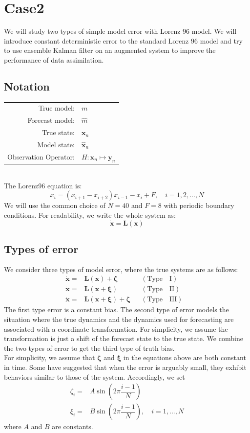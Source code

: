 \documentclass[twocolumn]{article}
\begin{document}
\section{Case2}
We will study two types of simple model error with Lorenz 96 model. We will introduce constant deterministic error to the standard Lorenz 96 model and try to use ensemble Kalman filter on an augmented system to improve the performance of data assimilation.
\subsection{Notation}
\begin{tabular}{rl}
True model:& $m$\\
Forecast model:& $\hat{m}$\\
True state:& $\pmb{x}_n$\\
Model state:& $\hat{\pmb{x}}_n$\\
Observation Operator:& $H:\pmb{x}_n\mapsto\pmb{y}_n$
\end{tabular}\\
The Lorenz96 equation is:
\begin{equation}
\dot{x_i}=(x_{i+1}-x_{i+2})x_{i-1}-x_{i}+F,\quad i=1,2,...,N
\end{equation}
We will use the common choice of $N=40$ and $F=8$ with periodic boundary conditions. For readability, we write the whole system as:
\begin{equation} \label{lorenz}
\pmb{\dot{x}}=\pmb{L}(\pmb{x})
\end{equation}
\subsection{Types of error}
We consider three types of model error, where the true systems are as follows:
\begin{align} 
\dot{\pmb{x}}=&\pmb{L}(\pmb{x})+\pmb{\zeta} 
&&\mathrm{(Type\quad I)}& \label{error1} \\
\dot{\pmb{x}}=&\pmb{L}(\pmb{x}+\pmb{\xi}) 
&&\mathrm{(Type\quad II)}&\label{error2} \\
\dot{\pmb{x}}=&\pmb{L}(\pmb{x}+\pmb{\xi})+\pmb{\zeta} 
&&\mathrm{(Type\quad III)}& \label{error3}
\end{align}
The first type error is a constant bias. The second type of error models the situation where the true dynamics and the dynamics used for forecasting are associated with a coordinate transformation. For simplicity, we assume the transformation is just a shift of the forecast state to the true state. We combine the two types of error to get the third type of truth bias.\\
For simplicity, we assume that $\pmb{\zeta}$ and $\pmb{\xi}$ in the equations above are both constant in time. Some have suggested that when the error is arguably small, they exhibit behaviors similar to those of the system. Accordingly, we set
\begin{align}
\zeta_i=&A\sin(2\pi\dfrac{i-1}{N}) \label{Adef} \\
\xi_i=&B\sin(2\pi\dfrac{i-1}{N}),\quad i=1,...,N \label{Bdef}
\end{align}
where $A$ and $B$ are constants.\\
\end{document}
